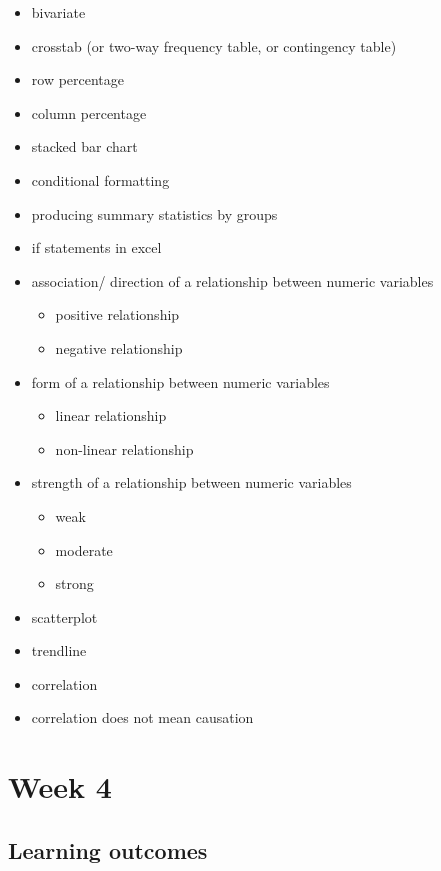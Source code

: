 \documentclass[]{book}
\providecommand{\tightlist}{%
  \setlength{\itemsep}{0pt}\setlength{\parskip}{0pt}}
\theoremstyle{definition}
\theoremstyle{definition}
\theoremstyle{definition}
\theoremstyle{remark}
\begin{document}
\begin{itemize}
\tightlist
\item
  bivariate
\item
  crosstab (or two-way frequency table, or contingency table)
\item
  row percentage
\item
  column percentage
\item
  stacked bar chart
\item
  conditional formatting
\item
  producing summary statistics by groups
\item
  if statements in excel
\item
  association/ direction of a relationship between numeric variables

  \begin{itemize}
  \tightlist
  \item
    positive relationship
  \item
    negative relationship
  \end{itemize}
\item
  form of a relationship between numeric variables

  \begin{itemize}
  \tightlist
  \item
    linear relationship
  \item
    non-linear relationship
  \end{itemize}
\item
  strength of a relationship between numeric variables

  \begin{itemize}
  \tightlist
  \item
    weak
  \item
    moderate
  \item
    strong
  \end{itemize}
\item
  scatterplot
\item
  trendline
\item
  correlation
\item
  correlation does not mean causation
\end{itemize}

\hypertarget{week4}{%
\chapter{Week 4}\label{week4}}

\hypertarget{learning-outcomes-3}{%
\section{Learning outcomes}\label{learning-outcomes-3}}
\end{document}
